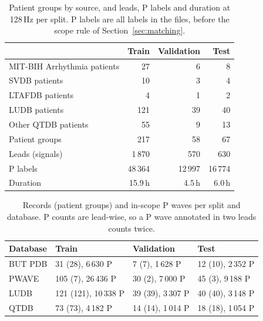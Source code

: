 \documentclass[11pt,a4paper]{article}
\begin{document}
\begin{table}[htbp]
\centering\small
\caption{Patient groups by source, and leads, P labels and duration at 128\,Hz per split. P labels are all labels in the files, before the scope rule of Section~\ref{sec:matching}.}
\label{tab:splitsize}
\begin{tabular}{lrrr}
\toprule
& Train & Validation & Test \\
\midrule
MIT-BIH Arrhythmia patients & 27 & 6 & 8 \\
SVDB patients & 10 & 3 & 4 \\
LTAFDB patients & 4 & 1 & 2 \\
LUDB patients & 121 & 39 & 40 \\
Other QTDB patients & 55 & 9 & 13 \\
\midrule
Patient groups & 217 & 58 & 67 \\
Leads (signals) & 1\,870 & 570 & 630 \\
P labels & 48\,364 & 12\,997 & 16\,774 \\
Duration & 15.9\,h & 4.5\,h & 6.0\,h \\
\bottomrule
\end{tabular}
\end{table}

\begin{table}[htbp]
\centering\small
\caption{Records (patient groups) and in-scope P waves per split and database. P counts are lead-wise, so a P wave annotated in two leads counts twice.}
\label{tab:splits}
\begin{tabular}{llll}
\toprule
Database & Train & Validation & Test \\
\midrule
BUT PDB & 31 (28), 6\,630 P & 7 (7), 1\,628 P & 12 (10), 2\,352 P \\
PWAVE & 105 (7), 26\,436 P & 30 (2), 7\,000 P & 45 (3), 9\,188 P \\
LUDB & 121 (121), 10\,338 P & 39 (39), 3\,307 P & 40 (40), 3\,148 P \\
QTDB & 73 (73), 4\,182 P & 14 (14), 1\,014 P & 18 (18), 1\,054 P \\
\bottomrule
\end{tabular}
\end{table}
\end{document}
